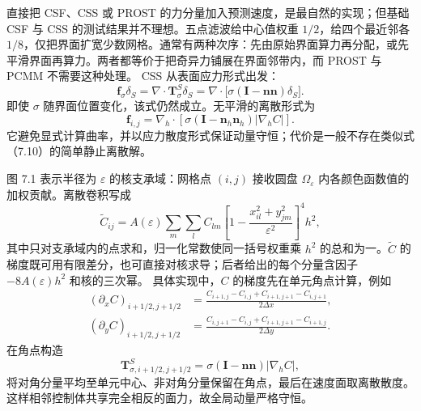 \documentclass[11pt,a4paper,openany,fontset=none]{ctexbook}
\begin{document}
直接把 CSF、CSS 或 PROST 的力分量加入预测速度，是最自然的实现；但基础 CSF 与 CSS 的测试结果并不理想。五点滤波给中心值权重 $1/2$，给四个最近邻各 $1/8$，仅把界面扩宽少数网格。通常有两种次序：先由原始界面算力再分配，或先平滑界面再算力。两者都等价于把奇异力铺展在界面邻带内，而 PROST 与 PCMM 不需要这种处理。
CSS 从表面应力形式出发：
\begin{equation}
  \boldsymbol f_\sigma\delta_S
  =\nabla\cdot\boldsymbol T^S_\sigma\delta_S
  =\nabla\cdot\bigl[\sigma(\boldsymbol I-\boldsymbol n\boldsymbol n)\delta_S\bigr].
  \tag{7.25}
\end{equation}
即使 $\sigma$ 随界面位置变化，该式仍然成立。无平滑的离散形式为
\begin{equation}
 \boldsymbol f_{i,j}=\nabla_h\cdot
 \left[\sigma(\boldsymbol I-\boldsymbol n_h\boldsymbol n_h)|\nabla_hC|\right].
 \tag{7.26}
\end{equation}
它避免显式计算曲率，并以应力散度形式保证动量守恒；代价是一般不存在类似式（7.10）的简单静止离散解。

图 7.1 表示半径为 $\varepsilon$ 的核支承域：网格点 $(i,j)$ 接收圆盘 $\Omega_\varepsilon$ 内各颜色函数值的加权贡献。离散卷积写成
\begin{equation}
\widetilde C_{ij}=A(\varepsilon)\sum_m\sum_l C_{lm}
\left[1-\frac{x_{il}^2+y_{jm}^2}{\varepsilon^2}\right]^4h^2,
\tag{7.37}
\end{equation}
其中只对支承域内的点求和，归一化常数使同一括号权重乘 $h^2$ 的总和为一。$\widetilde C$ 的梯度既可用有限差分，也可直接对核求导；后者给出的每个分量含因子 $-8A(\varepsilon)h^2$ 和核的三次幂。
具体实现中，$C$ 的梯度先在单元角点计算，例如
\begin{align}
 (\partial_xC)_{i+1/2,j+1/2}
 &=\frac{C_{i+1,j}-C_{i,j}+C_{i+1,j+1}-C_{i,j+1}}{2\Delta x},\\
 (\partial_yC)_{i+1/2,j+1/2}
 &=\frac{C_{i,j+1}-C_{i,j}+C_{i+1,j+1}-C_{i+1,j}}{2\Delta y}.
 \tag{7.27--7.28}
\end{align}
在角点构造
\begin{equation}
 \boldsymbol T^S_{\sigma,i+1/2,j+1/2}
 =\sigma(\boldsymbol I-\boldsymbol n\boldsymbol n)|\nabla_hC|,
 \tag{7.29}
\end{equation}
将对角分量平均至单元中心、非对角分量保留在角点，最后在速度面取离散散度。这样相邻控制体共享完全相反的面力，故全局动量严格守恒。
\end{document}
